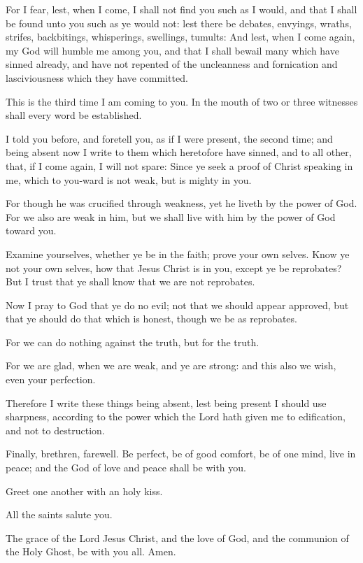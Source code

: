 \Verse For I fear, lest, when I come, I shall not find you such as I would, and that I shall be found unto you such as ye would not: lest there be debates, envyings, wraths, strifes, backbitings, whisperings, swellings, tumults: \Verse And lest, when I come again, my God will humble me among you, and that I shall bewail many which have sinned already, and have not repented of the uncleanness and fornication and lasciviousness which they have committed.


\Chapter
\Verse This is the third time I am coming to you. In the mouth of two or three witnesses shall every word be established.

\Verse I told you before, and foretell you, as if I were present, the second time; and being absent now I write to them which heretofore have sinned, and to all other, that, if I come again, I will not spare: \Verse Since ye seek a proof of Christ speaking in me, which to you-ward is not weak, but is mighty in you.

\Verse For though he was crucified through weakness, yet he liveth by the power of God. For we also are weak in him, but we shall live with him by the power of God toward you.

\Verse Examine yourselves, whether ye be in the faith; prove your own selves. Know ye not your own selves, how that Jesus Christ is in you, except ye be reprobates?  \Verse But I trust that ye shall know that we are not reprobates.

\Verse Now I pray to God that ye do no evil; not that we should appear approved, but that ye should do that which is honest, though we be as reprobates.

\Verse For we can do nothing against the truth, but for the truth.

\Verse For we are glad, when we are weak, and ye are strong: and this also we wish, even your perfection.

\Verse Therefore I write these things being absent, lest being present I should use sharpness, according to the power which the Lord hath given me to edification, and not to destruction.

\Verse Finally, brethren, farewell. Be perfect, be of good comfort, be of one mind, live in peace; and the God of love and peace shall be with you.

\Verse Greet one another with an holy kiss.

\Verse All the saints salute you.

\Verse The grace of the Lord Jesus Christ, and the love of God, and the communion of the Holy Ghost, be with you all. Amen.

